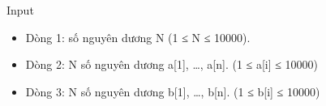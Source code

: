 Input
\begin{itemize}
	\item     Dòng 1: số nguyên dương N (1 ≤ N ≤ 10000).   
	\item     Dòng 2: N số nguyên dương a[1], …, a[n]. (1 ≤ a[i] ≤ 10000)   
	\item     Dòng 3: N số nguyên dương b[1], …, b[n]. (1 ≤ b[i] ≤ 10000)   
\end{itemize}